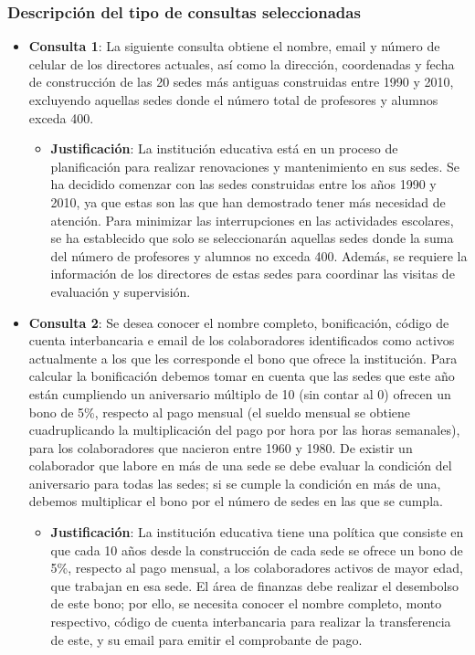 \subsubsection{Descripción del tipo de consultas seleccionadas}
\begin{itemize}
	\item{\textbf{Consulta 1}: La siguiente consulta obtiene el nombre, email y número de celular de los directores actuales, así como la dirección, coordenadas y fecha de construcción de las 20 sedes más antiguas construidas entre 1990 y 2010, excluyendo aquellas sedes donde el número total de profesores y alumnos exceda 400.}
	      \begin{itemize}
		      \item{\textbf{Justificación}: La institución educativa está en un proceso de planificación para realizar renovaciones y mantenimiento en sus sedes. Se ha decidido comenzar con las sedes construidas entre los años 1990 y 2010, ya que estas son las que han demostrado tener más necesidad de atención. Para minimizar las interrupciones en las actividades escolares, se ha establecido que solo se seleccionarán aquellas sedes donde la suma del número de profesores y alumnos no exceda 400. Además, se requiere la información de los directores de estas sedes para coordinar las visitas de evaluación y supervisión.}
	      \end{itemize}
	\item{\textbf{Consulta 2}: Se desea conocer el nombre completo, bonificación, código de cuenta interbancaria e email de los colaboradores identificados como activos actualmente a los que les corresponde el bono que ofrece la institución. Para calcular la bonificación debemos tomar en cuenta que las sedes que este año están cumpliendo un aniversario múltiplo de 10 (sin contar al 0) ofrecen un bono de 5\%, respecto al pago mensual (el sueldo mensual se obtiene cuadruplicando la multiplicación del pago por hora por las horas semanales), para los colaboradores que nacieron entre 1960 y 1980. De existir un colaborador que labore en más de una sede se debe evaluar la condición del aniversario para todas las sedes; si se cumple la condición en más de una, debemos multiplicar el bono por el número de sedes en las que se cumpla.}
	      \begin{itemize}
		      \item{\textbf{Justificación}: La institución educativa tiene una política que consiste en que cada 10 años desde la construcción de cada sede se ofrece un bono de 5\%, respecto al pago mensual, a los colaboradores activos de mayor edad, que trabajan en esa sede. El área de finanzas debe realizar el desembolso de este bono; por ello, se necesita conocer el nombre completo, monto respectivo, código de cuenta interbancaria para realizar la transferencia de este, y su email para emitir el comprobante de pago.}

\end{itemize}
\end{itemize}
